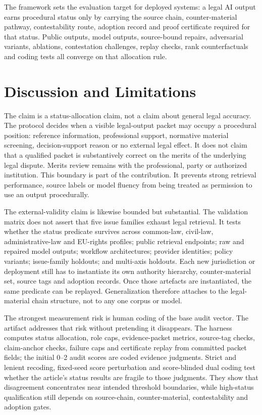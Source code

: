 \documentclass[12pt,a4paper]{article}
\begin{document}
The framework sets the evaluation target for deployed systems: a legal AI output earns procedural status only by carrying the source chain, counter-material pathway, contestability route, adoption record and proof certificate required for that status. Public outputs, model outputs, source-bound repairs, adversarial variants, ablations, contestation challenges, replay checks, rank counterfactuals and coding tests all converge on that allocation rule.

\section{Discussion and Limitations}

The claim is a status-allocation claim, not a claim about general legal accuracy. The protocol decides when a visible legal-output packet may occupy a procedural position: reference information, professional support, normative material screening, decision-support reason or no external legal effect. It does not claim that a qualified packet is substantively correct on the merits of the underlying legal dispute. Merits review remains with the professional, party or authorized institution. This boundary is part of the contribution. It prevents strong retrieval performance, source labels or model fluency from being treated as permission to use an output procedurally.

The external-validity claim is likewise bounded but substantial. The validation matrix does not assert that five issue families exhaust legal retrieval. It tests whether the status predicate survives across common-law, civil-law, administrative-law and EU-rights profiles; public retrieval endpoints; raw and repaired model outputs; workflow architectures; provider identities; policy variants; issue-family holdouts; and multi-axis holdouts. Each new jurisdiction or deployment still has to instantiate its own authority hierarchy, counter-material set, source tags and adoption records. Once those artefacts are instantiated, the same predicate can be replayed. Generalization therefore attaches to the legal-material chain structure, not to any one corpus or model.

The strongest measurement risk is human coding of the base audit vector. The artifact addresses that risk without pretending it disappears. The harness computes status allocation, role caps, evidence-packet metrics, source-tag checks, claim-anchor checks, failure caps and certificate replay from committed packet fields; the initial 0--2 audit scores are coded evidence judgments. Strict and lenient recoding, fixed-seed score perturbation and score-blinded dual coding test whether the article's status results are fragile to those judgments. They show that disagreement concentrates near intended threshold boundaries, while high-status qualification still depends on source-chain, counter-material, contestability and adoption gates.
\end{document}
